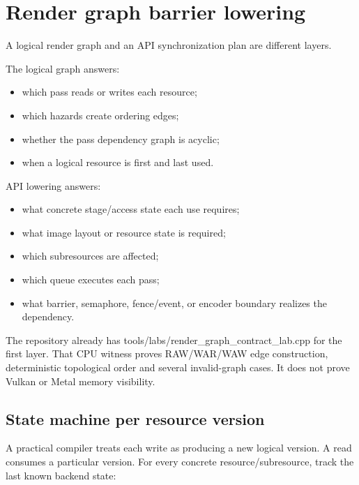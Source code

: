 \hypertarget{appendix-0fc95374cb7e}{}
\section{Render graph barrier lowering}\label{appendix-0fc95374cb7e-render-graph-barrier-lowering}

A logical render graph and an API synchronization plan are different layers.

The logical graph answers:

\begin{itemize}
\tightlist
\item
  which pass reads or writes each resource;
\item
  which hazards create ordering edges;
\item
  whether the pass dependency graph is acyclic;
\item
  when a logical resource is first and last used.
\end{itemize}

API lowering answers:

\begin{itemize}
\tightlist
\item
  what concrete stage/access state each use requires;
\item
  what image layout or resource state is required;
\item
  which subresources are affected;
\item
  which queue executes each pass;
\item
  what barrier, semaphore, fence/event, or encoder boundary realizes the dependency.
\end{itemize}

The repository already has tools/labs/render\_graph\_contract\_lab.cpp for the first layer. That CPU witness proves RAW/WAR/WAW edge construction, deterministic topological order and several invalid-graph cases. It does not prove Vulkan or Metal memory visibility.

\subsection{State machine per resource version}\label{appendix-0fc95374cb7e-state-machine-per-resource-version}

A practical compiler treats each write as producing a new logical version. A read consumes a particular version. For every concrete resource/subresource, track the last known backend state:

